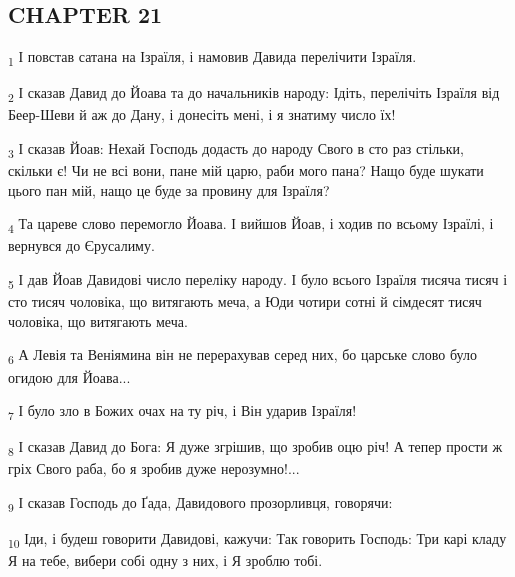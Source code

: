 \subsection{CHAPTER 21}
\begin{tcolorbox}
\textsubscript{1} І повстав сатана на Ізраїля, і намовив Давида перелічити Ізраїля.
\end{tcolorbox}
\begin{tcolorbox}
\textsubscript{2} І сказав Давид до Йоава та до начальників народу: Ідіть, перелічіть Ізраїля від Беер-Шеви й аж до Дану, і донесіть мені, і я знатиму число їх!
\end{tcolorbox}
\begin{tcolorbox}
\textsubscript{3} І сказав Йоав: Нехай Господь додасть до народу Свого в сто раз стільки, скільки є! Чи не всі вони, пане мій царю, раби мого пана? Нащо буде шукати цього пан мій, нащо це буде за провину для Ізраїля?
\end{tcolorbox}
\begin{tcolorbox}
\textsubscript{4} Та цареве слово перемогло Йоава. І вийшов Йоав, і ходив по всьому Ізраїлі, і вернувся до Єрусалиму.
\end{tcolorbox}
\begin{tcolorbox}
\textsubscript{5} І дав Йоав Давидові число переліку народу. І було всього Ізраїля тисяча тисяч і сто тисяч чоловіка, що витягають меча, а Юди чотири сотні й сімдесят тисяч чоловіка, що витягають меча.
\end{tcolorbox}
\begin{tcolorbox}
\textsubscript{6} А Левія та Веніямина він не перерахував серед них, бо царське слово було огидою для Йоава...
\end{tcolorbox}
\begin{tcolorbox}
\textsubscript{7} І було зло в Божих очах на ту річ, і Він ударив Ізраїля!
\end{tcolorbox}
\begin{tcolorbox}
\textsubscript{8} І сказав Давид до Бога: Я дуже згрішив, що зробив оцю річ! А тепер прости ж гріх Свого раба, бо я зробив дуже нерозумно!...
\end{tcolorbox}
\begin{tcolorbox}
\textsubscript{9} І сказав Господь до Ґада, Давидового прозорливця, говорячи:
\end{tcolorbox}
\begin{tcolorbox}
\textsubscript{10} Іди, і будеш говорити Давидові, кажучи: Так говорить Господь: Три карі кладу Я на тебе, вибери собі одну з них, і Я зроблю тобі.
\end{tcolorbox}
